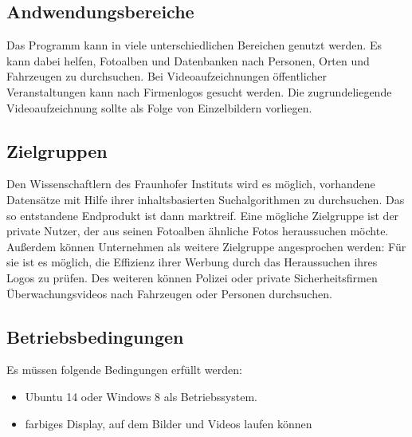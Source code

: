 \subsection{Andwendungsbereiche}

Das Programm kann in viele unterschiedlichen Bereichen genutzt werden. Es kann dabei helfen, Fotoalben und Datenbanken nach Personen, Orten und Fahrzeugen zu durchsuchen. Bei Videoaufzeichnungen öffentlicher Veranstaltungen kann nach Firmenlogos gesucht werden. Die zugrundeliegende Videoaufzeichnung sollte als Folge von Einzelbildern vorliegen.

\subsection{Zielgruppen}

Den Wissenschaftlern des Fraunhofer Instituts wird es möglich, vorhandene Datensätze mit Hilfe ihrer inhaltsbasierten Suchalgorithmen zu durchsuchen. Das so entstandene Endprodukt ist dann marktreif.
Eine mögliche Zielgruppe ist der private Nutzer, der aus seinen Fotoalben ähnliche Fotos heraussuchen möchte. 
Außerdem können Unternehmen als weitere Zielgruppe angesprochen werden: Für sie ist es möglich, die Effizienz ihrer Werbung durch das Heraussuchen ihres Logos zu prüfen. 
Des weiteren können Polizei oder private Sicherheitsfirmen Überwachungsvideos nach Fahrzeugen oder Personen durchsuchen.

\subsection{Betriebsbedingungen}

Es müssen folgende Bedingungen erfüllt werden:

\begin{itemize}

\item Ubuntu 14 oder Windows 8 als Betriebssystem.
\item farbiges Display, auf dem Bilder und Videos laufen können 

\end{itemize}

